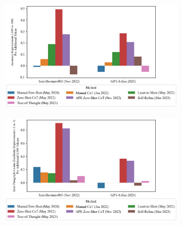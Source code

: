 \documentclass[11pt]{article}
\begin{document}

\begin{figure}
  \caption{Gains Per Token v. Direct Prompting}
  \begin{subfigure}[h]{0.4925\textwidth}
      \centering
      \includegraphics[width=0.95\hsize]{../Output/gsm8k_change_in_accuracy_quality_per_change_in_conversation_length_sorted_by_technique_age.png} 
  \end{subfigure}
  \begin{subfigure}[h]{0.4925\textwidth}
      \centering
      \includegraphics[width=0.95\hsize]{../Output/cw_change_in_accuracy_quality_per_change_in_conversation_length_sorted_by_technique_age_transformed.png}
  \end{subfigure}
  \hfill
  \label{fig:gains_v_dp}
\end{figure}
\end{document}

